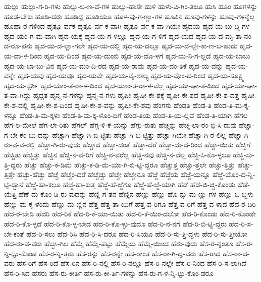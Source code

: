 {ಹುಲ್ಲು
ಹುಲ್ಲು-ಗ-ರಿ-ಗಳು
ಹುಲ್ಲು-ಬ-ಣ-ವೆ-ಗಳ
ಹುಲ್ಲು-ಹಾಸೇ
ಹುಳಿ
ಹುಳು-ವಿ-ಗಿಂ-ತಲೂ
ಹುಸಿ
ಹೂಂ
ಹೂಗಳನ್ನು
ಹೂಡ-ಬೇಕು
ಹೂಡಿ-ದರು
ಹೂಡಿದ್ದ
ಹೂಡಿಯೂ
ಹೂಳ-ಪು-ಗ-ಣ್ಣು-ಗಳ
ಹೂವಿನ
ಹೂವು-ಗಳನ್ನು
ಹೂವು-ಗಳನ್ನೆಲ್ಲ
ಹೂಹಾ-ರ-ಗಳಿಂದ
ಹೃತ್ಪೂ-ರ್ವಕ
ಹೃತ್ಪೂ-ರ್ವ-ಕ-ವಾಗಿ
ಹೃತ್ಪೂ-ರ್ವ-ಕ-ವಾ-ಗಿಯೇ
ಹೃದಯ
ಹೃದ-ಯ-ಬು-ದ್ಧಿ-ಗಳ
ಹೃದ-ಯಂ-ಗ-ಮ-ವಾಗಿ
ಹೃದ-ಯಕ್ಕೆ
ಹೃದ-ಯ-ಗ-ಳಲ್ಲೂ
ಹೃದ-ಯ-ಗ-ಳಿಗೆ
ಹೃದ-ಯದ
ಹೃದ-ಯ-ದ-ಮೃ-ತಾ-ನಂ-ದ-ರೂ-ಪನು
ಹೃದ-ಯ-ದ-ಲ್ಲಾ-ಗಲೇ
ಹೃದ-ಯ-ದಲ್ಲಿ
ಹೃದ-ಯ-ದಲ್ಲೂ
ಹೃದ-ಯ-ದ-ಲ್ಲೇ-ಕಾ-ಣ-ಬ-ಹುದು
ಹೃದ-ಯ-ದಾ-ಳ-ದಿಂದ
ಹೃದ-ಯ-ದಿಂದ
ಹೃದ-ಯ-ದುಂಬಿ
ಹೃದ-ಯ-ದೊ-ಳಗೆ
ಹೃದ-ಯ-ನಿ-ಗ-ಲ್ಲದೆ
ಹೃದ-ಯ-ಬಾಬು
ಹೃದ-ಯ-ಬಾ-ಬು-ವಿನ
ಹೃದ-ಯ-ಮಂ-ದಿ-ರದ
ಹೃದ-ಯ-ರಾಮ
ಹೃದ-ಯ-ವಂ-ತಿಕೆ
ಹೃದ-ಯ-ವನ್ನು
ಹೃದ-ಯ-ವನ್ನೇ
ಹೃದ-ಯವು
ಹೃದ-ಯವೂ
ಹೃದ-ಯವೇ
ಹೃದ-ಯ-ವೈ-ಶಾಲ್ಯ
ಹೃದ-ಯ-ವೊಂ-ದ-ರಿಂದ
ಹೃದ-ಯ-ಸೂಕ್ಷ್ಮ
ಹೃದ-ಯ-ಸ್ಪರ್ಶಿ
ಹೃದ-ಯಾಂ-ತ-ರಾ-ಳ-ದಿಂದ
ಹೃದ-ಯಾಂ-ತ-ರಾ-ಳ-ವೆಲ್ಲ
ಹೃದ-ಯಾ-ಘಾ-ತ-ದಿಂದ
ಹೃದ-ಯಾ-ಘಾ-ತ-ವಾ-ಗಿದ್ದು
ಹೃದ್ಗತ
ಹೃನ್ಮ-ನ-ಗಳನ್ನು
ಹೃನ್ಮ-ನ-ಗಳು
ಹೃಷೀ
ಹೃಷೀ-ಕೇ-ಶಕ್ಕೆ
ಹೃಷೀ-ಕೇ-ಶದ
ಹೃಷೀ-ಕೇ-ಶ-ದತ್ತ
ಹೃಷೀ-ಕೇ-ಶ-ದಲ್ಲಿ
ಹೃಷೀ-ಕೇ-ಶ-ದಿಂದ
ಹೃಷೀ-ಕೇ-ಶ-ವನ್ನು
ಹೃಷೀ-ಕೇ-ಶವು
ಹೆಂಗಸು
ಹೆಂಡತಿ
ಹೆಂಡ-ತಿ
ಹೆಂಡ-ತಿ-ಮ-ಕ್ಕ-ಳನ್ನೂ
ಹೆಂಡ-ತಿ-ಮ-ಕ್ಕಳು
ಹೆಂಡ-ತಿ-ಮ-ಕ್ಕ-ಳೊಂ-ದಿಗೆ
ಹೆಂಡ-ತಿಯ
ಹೆಂಡ-ತಿ-ಯ-ಲ್ಲವೆ
ಹೆಂಡ-ತಿ-ಯಾಗಿ
ಹೆಗಲ
ಹೆಗ-ಲ-ಮೇಲೆ
ಹೆಗ-ಲೇ-ರಿತು
ಹೆಗಲ್
ಹೆಗ್ಗ-ಳಿ-ಕೆ-ಯನ್ನು
ಹೆಗ್ಗು-ರುತು
ಹೆಚ್ಚನ್ನು
ಹೆಚ್ಚ-ಲಾ-ರಂ-ಭಿ-ಸಿ-ದುವು
ಹೆಚ್ಚಾ-ಗ-ಬೇ-ಕೆಂ-ಬು-ದನ್ನು
ಹೆಚ್ಚಾಗಿ
ಹೆಚ್ಚಾ-ಗಿ-ಬಿ-ಟ್ಟಿತು
ಹೆಚ್ಚಾ-ಗಿ-ಬಿ-ಟ್ಟಿತ್ತು
ಹೆಚ್ಚಾ-ಗಿಯೇ
ಹೆಚ್ಚಾ-ಗಿ-ರ-ಲಿಲ್ಲ
ಹೆಚ್ಚಾ-ಗಿ-ರು-ವ-ವ-ರಲ್ಲಿ
ಹೆಚ್ಚಾ-ಗಿ-ರು-ವುದು
ಹೆಚ್ಚಾದ
ಹೆಚ್ಚಾ-ದಂತೆ
ಹೆಚ್ಚಾ-ದರೆ
ಹೆಚ್ಚಾ-ದು-ದ-ರಿಂದ
ಹೆಚ್ಚಾ-ಯಿತು
ಹೆಚ್ಚಿಗೆ
ಹೆಚ್ಚಿತು
ಹೆಚ್ಚಿತ್ತು
ಹೆಚ್ಚಿನ
ಹೆಚ್ಚಿ-ನ-ವ-ರಿಗೆ
ಹೆಚ್ಚಿ-ನ-ವರೆಲ್ಲ
ಹೆಚ್ಚಿ-ನವು
ಹೆಚ್ಚಿ-ನ-ವೆಲ್ಲ
ಹೆಚ್ಚಿ-ಸಿ-ಕೊ-ಳ್ಳಲೂ
ಹೆಚ್ಚಿ-ಸು-ತ್ತಿ-ದ್ದರು
ಹೆಚ್ಚು
ಹೆಚ್ಚು-ಕ-ಡಿಮೆ
ಹೆಚ್ಚು-ಕ-ಡಿ-ಮೆ-ಯಾ-ಗಿ-ಬಿ-ಟ್ಟಿ-ದ್ದರೂ
ಹೆಚ್ಚುತ್ತ
ಹೆಚ್ಚು-ತ್ತಲೇ
ಹೆಚ್ಚು-ತ್ತಿತ್ತು
ಹೆಚ್ಚು-ತ್ತಿತ್ತೇ
ಹೆಚ್ಚು-ಹೆಚ್ಚು
ಹೆಚ್ಚೆ
ಹೆಚ್ಚೆಂ-ದರೆ
ಹೆಚ್ಚೆಚ್ಚು
ಹೆಚ್ಚೇ
ಹೆಚ್ಚೇನೂ
ಹೆಜ್ಜೆ
ಹೆಜ್ಜೆಯ
ಹೆಜ್ಜೆ-ಯನ್ನೂ
ಹೆಜ್ಜೆ-ಯೊಂ-ದ-ನ್ನಿ-ಟ್ಟಿ-ದ್ದಾನೆ
ಹೆಜ್ಜೆ-ಹಾ-ಕಲೂ
ಹೆಜ್ಜೆ-ಹಾ-ಕುತ್ತ
ಹೆಜ್ಜೆ-ಹೆ-ಜ್ಜೆಗೂ
ಹೆಜ್ಜೆ-ಹೆ-ಜ್ಜೆ-ಯಾಗಿ
ಹೆಡೆ
ಹೆಡೆ-ಬಿ-ಚ್ಚಿ-ಕೊಂಡು
ಹೆಡೆ-ಯೆತ್ತಿ
ಹೆಣೆ-ದು-ಕೊಂ-ಡಿ-ರು-ವುದನ್ನು
ಹೆಣ್ಣಿ-ಗ-ತನ
ಹೆಣ್ಣಿನ
ಹೆಣ್ಣು
ಹೆಣ್ಣು-ಹೊ-ನ್ನು-ಮ-ಣ್ಣು-ಗಳ
ಹೆಣ್ಣು-ಒ-ಬ್ಬಳು
ಹೆಣ್ಣು-ಮ-ಕ್ಕ-ಳೆಂದು
ಹೆಣ್ಣು-ಮ-ಣ್ಣಿನ
ಹೆತ್ತ
ಹೆತ್ತ-ತಾ-ಯಿಗೆ
ಹೆತ್ತ-ವ-ರಿಗೂ
ಹೆತ್ತ-ವ-ರಿಗೆ
ಹೆತ್ತ-ವ-ಳಾದ
ಹೆದ-ರ-ದಿರಿ
ಹೆದ-ರ-ಬೇಡಿ
ಹೆದರಿ
ಹೆದ-ರಿಕೆ
ಹೆದ-ರಿ-ಕೆ-ಯಾ-ಯಿತು
ಹೆದ-ರಿ-ಕೆ-ಯಿಂ-ದಲೋ
ಹೆದ-ರಿ-ಕೊಂಡು
ಹೆದ-ರಿ-ಕೊಂಡೇ
ಹೆದ-ರಿ-ಕೊ-ಳ್ಳದೆ
ಹೆದ-ರಿ-ಕೊ-ಳ್ಳ-ಬೇಡ
ಹೆದ-ರಿ-ಕೊ-ಳ್ಳು-ವುದೂ
ಹೆದ-ರಿ-ನ-ನಗೆ
ಹೆದ-ರಿ-ಬಿ-ಟ್ಟಿ-ದ್ದರು
ಹೆದ-ರಿ-ಸ-ಬೇ-ಕಂತೆ
ಹೆದ-ರಿ-ಸಲು
ಹೆದ-ರಿಸಿ
ಹೆದ-ರಿ-ಸಿ-ದರೂ
ಹೆದ-ರಿ-ಸಿಯೂ
ಹೆದ-ರಿ-ಸು-ತ್ತಿ-ದ್ದಳು
ಹೆದ-ರಿ-ಸು-ತ್ತೀಯೋ
ಹೆದ-ರು-ವ-ವರು
ಹೆಬ್ಬಾ-ಗಿಲ
ಹೆಮ್ಮೆ
ಹೆಮ್ಮೆ-ಪಟ್ಟು
ಹೆಮ್ಮೆಯ
ಹೆಮ್ಮೆ-ಯಿಂದ
ಹೆರು-ವುದು
ಹೆಸ-ರ-ನ್ನಂತೂ
ಹೆಸ-ರ-ನ್ನಿ-ಟ್ಟು-ಕೊಂಡ
ಹೆಸ-ರ-ನ್ನಿ-ತ್ತರು
ಹೆಸ-ರನ್ನು
ಹೆಸ-ರನ್ನೇ
ಹೆಸ-ರಾಂತ
ಹೆಸ-ರಾ-ಗಿ-ದ್ದ-ವರು
ಹೆಸ-ರಾದ
ಹೆಸ-ರಾ-ದ-ವರು
ಹೆಸ-ರಿಗೆ
ಹೆಸ-ರಿದೆ
ಹೆಸ-ರಿನ
ಹೆಸ-ರಿ-ನಲ್ಲಿ
ಹೆಸ-ರಿ-ನಲ್ಲೂ
ಹೆಸ-ರಿ-ನಲ್ಲೇ
ಹೆಸ-ರಿ-ನಿಂದ
ಹೆಸ-ರಿ-ಸ-ಲಾಗಿದೆ
ಹೆಸ-ರಿ-ಸಿದ
ಹೆಸರು
ಹೆಸ-ರು-ಕೀರ್ತಿ
ಹೆಸ-ರು-ಕೀ-ರ್ತಿ-ಗಳನ್ನು
ಹೆಸ-ರು-ಗ-ಳ-ನ್ನಿ-ಟ್ಟು-ಕೊಂ-ಡರೂ
}
